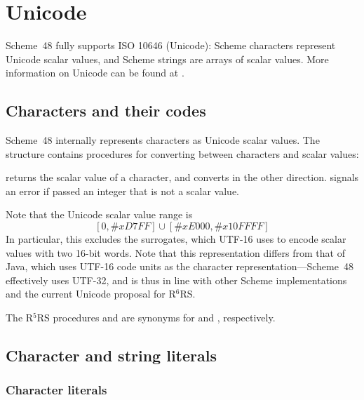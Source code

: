 \chapter{Unicode}

Scheme~48 fully supports ISO 10646 (Unicode): Scheme characters
represent Unicode scalar values, and Scheme strings are arrays of
scalar values.  More information on Unicode can be found at
.

\section{Characters and their codes}

Scheme~48 internally represents characters as Unicode scalar values.
The  structure contains procedures for converting
between characters and scalar values:
%
\begin{protos}
\end{protos}
%
 returns the scalar value of a character, and
 converts in the other direction.
 signals an error if passed an integer that is
not a scalar value.

Note that the Unicode scalar value range is
%
\begin{displaymath}
\left[0,\#x\mathit{D7FF}\right] \cup \left[\#x\mathit{E000}, \#x\mathit{10FFFF}\right]
\end{displaymath}
%
In particular, this excludes the surrogates, which UTF-16 uses to
encode scalar values with two 16-bit words.  Note that this
representation differs from that of Java, which uses UTF-16 code units
as the character representation---Scheme~48 effectively uses UTF-32,
and is thus in line with other Scheme implementations and the current
Unicode proposal for R$^6$RS.

The R$^5$RS procedures  and 
are synonyms for  and
, respectively.

\section{Character and string literals}

\subsection{Character literals}


